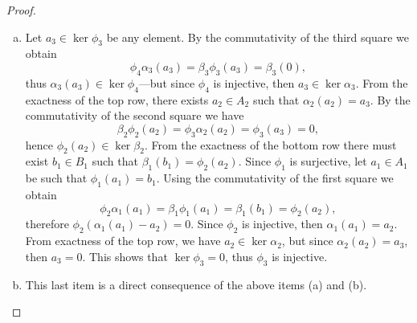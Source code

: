 \begin{proof}
\begin{enumerate}[(a)]
        \item Let \(a_3 \in \ker \phi_3\) be any element. By the commutativity of the
              third square we obtain
              \[
                  \phi_4 \alpha_3 (a_3) = \beta_3 \phi_3(a_3) = \beta_3(0),
              \]
              thus \(\alpha_3(a_3) \in \ker \phi_4\)---but since \(\phi_4\) is injective,
              then \(a_3 \in \ker \alpha_3\). From the exactness of the top row, there
              exists \(a_2 \in A_2\) such that \(\alpha_2(a_2) = a_3\). By the commutativity
              of the second square we have
              \[
                  \beta_2 \phi_2(a_2) = \phi_3 \alpha_2(a_2) = \phi_3(a_3) = 0,
              \]
              hence \(\phi_2(a_2) \in \ker \beta_2\). From the exactness of the bottom row
              there must exist \(b_1 \in B_1\) such that \(\beta_1(b_1) =
              \phi_2(a_2)\). Since \(\phi_1\) is surjective, let \(a_1 \in A_1\) be such
              that \(\phi_1(a_1) = b_1\). Using the commutativity of the first square we
              obtain
              \[
                  \phi_2 \alpha_1(a_1) = \beta_1 \phi_1(a_1) = \beta_1(b_1) = \phi_2(a_2),
              \]
              therefore \(\phi_2(\alpha_1(a_1) - a_2) = 0\). Since \(\phi_2\) is injective,
              then \(\alpha_1(a_1) = a_2\). From exactness of the top row, we have \(a_2 \in
              \ker \alpha_2\), but since \(\alpha_2(a_2) = a_3\), then \(a_3 = 0\). This
              shows that \(\ker \phi_3 = 0\), thus \(\phi_3\) is injective.

        \item This last item is a direct consequence of the above items (a) and (b).
    \end{enumerate}
\end{proof}

